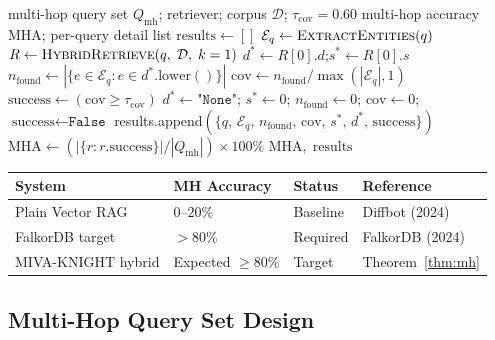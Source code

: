 \documentclass[12pt,a4paper]{article}
\theoremstyle{definition}
\theoremstyle{plain}
\theoremstyle{remark}
\begin{document}
\begin{algorithm}[H]
\caption{Protocol 2 --- \textsc{MultiHopTest}}
\label{alg:proto2}
\begin{algorithmic}[1]
\Require multi-hop query set $Q_{\text{mh}}$; retriever; corpus $\mathcal{D}$;
         $\tau_{\text{cov}} = 0.60$
\Ensure multi-hop accuracy $\mathrm{MHA}$; per-query detail list
\State $\text{results} \gets []$
  \State $\mathcal{E}_q \gets \textsc{ExtractEntities}(q)$
  \State $R \gets \textsc{HybridRetrieve}(q,\; \mathcal{D},\; k=1)$
    \State $d^* \gets R[0].d$;\quad $s^* \gets R[0].s$
    \State $n_{\text{found}} \gets
      |\{e \in \mathcal{E}_q : e \in d^*.\mathrm{lower}()\}|$
    \State $\text{cov} \gets n_{\text{found}} / \max(|\mathcal{E}_q|, 1)$
    \State $\text{success} \gets (\text{cov} \geq \tau_{\text{cov}})$
  \Else
    \State $d^* \gets \texttt{"None"}$;\quad
           $s^* \gets 0$;\quad
           $n_{\text{found}} \gets 0$;\quad
           $\text{cov} \gets 0$;\quad
           $\text{success} \gets \texttt{False}$
  \EndIf
  \State results.append$(\{q,\, \mathcal{E}_q,\,
    n_{\text{found}},\, \text{cov},\, s^*,\, d^*,\,
    \text{success}\})$
\EndFor
\State $\mathrm{MHA} \gets
  (|\{r : r.\text{success}\}| / |Q_{\text{mh}}|) \times 100\%$
\State \Return $\mathrm{MHA},\; \text{results}$
\end{algorithmic}
\end{algorithm}

\begin{tcolorbox}[keybox, title=Protocol 2 Benchmark Summary]
\renewcommand{\arraystretch}{1.3}
\begin{tabular}{llll}
\toprule
\textbf{System} & \textbf{MH Accuracy} & \textbf{Status} & \textbf{Reference} \\
\midrule
Plain Vector RAG   & $0$--$20\%$ & Baseline & Diffbot (2024) \\
FalkorDB target    & $>80\%$     & Required & FalkorDB (2024) \\
MIVA-KNIGHT hybrid & Expected $\geq80\%$ & Target & Theorem~\ref{thm:mh} \\
\bottomrule
\end{tabular}
\end{tcolorbox}

\subsection{Multi-Hop Query Set Design}
\end{document}
